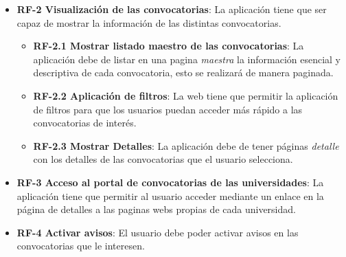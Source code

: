 \begin{itemize}
\item\textbf{RF-2 Visualización de las convocatorias}: La aplicación tiene que ser capaz de mostrar la información de las distintas convocatorias.
\begin{itemize}
\item\textbf{RF-2.1 Mostrar listado maestro de las convocatorias}: La aplicación debe de listar en una pagina \textit{maestra} la información esencial y descriptiva de cada convocatoria, esto se realizará de manera paginada.
\item\textbf{RF-2.2 Aplicación de filtros}: La web tiene que permitir la aplicación de filtros para que los usuarios puedan acceder más rápido a las convocatorias de interés.
\item\textbf{RF-2.3 Mostrar Detalles}: La aplicación debe de tener páginas \textit{detalle} con los detalles de las convocatorias que el usuario selecciona.

\end{itemize}

\item\textbf{RF-3 Acceso al portal de convocatorias de las universidades}: La aplicación tiene que permitir al usuario acceder mediante un enlace en la página de detalles a las paginas webs propias de cada universidad.

\item\textbf{RF-4 Activar avisos}: El usuario debe poder activar avisos en las convocatorias que le interesen.


\end{itemize}
